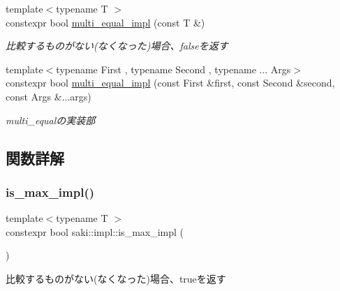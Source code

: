 \begin{DoxyCompactItemize}
{\footnotesize template$<$typename T $>$ }\\constexpr bool \mbox{\hyperlink{namespacesaki_1_1impl_ac271639854025a923addee4879780f96}{multi\+\_\+equal\+\_\+impl}} (const T \&)
\begin{DoxyCompactList}\small\item\em 比較するものがない(なくなった)場合、falseを返す \end{DoxyCompactList}\item 
{\footnotesize template$<$typename First , typename Second , typename ... Args$>$ }\\constexpr bool \mbox{\hyperlink{namespacesaki_1_1impl_afd0543c20cbd7373bceba87c2af5b3de}{multi\+\_\+equal\+\_\+impl}} (const First \&first, const Second \&second, const Args \&...args)
\begin{DoxyCompactList}\small\item\em multi\+\_\+equalの実装部 \end{DoxyCompactList}\end{DoxyCompactItemize}


\subsection{関数詳解}
\mbox{\label{namespacesaki_1_1impl_a1eb562842d6a5bcde39a463f04755157}} 
\subsubsection{\texorpdfstring{is\+\_\+max\+\_\+impl()}{is\_max\_impl()}\hspace{0.1cm}{\footnotesize\ttfamily [1/2]}}
{\footnotesize\ttfamily template$<$typename T $>$ \\
constexpr bool saki\+::impl\+::is\+\_\+max\+\_\+impl (\begin{DoxyParamCaption}\item[{const T \&}]{ }\end{DoxyParamCaption})}



比較するものがない(なくなった)場合、trueを返す 

\mbox{\label{namespacesaki_1_1impl_ad5f6398b5affbb107eb4e49c35e36e6a}} 
